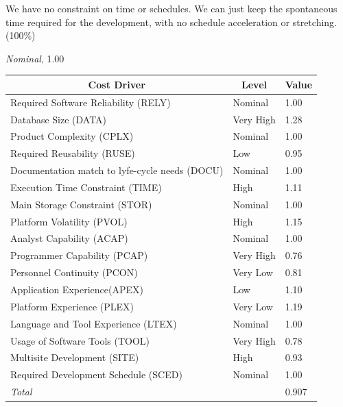 \documentclass[english]{article}
\begin{document}
\begin{itemize}
We have no constraint on time or schedules. We can just keep the spontaneous time required for the development, with no schedule acceleration or stretching. (100\%)

\textit{Nominal}, 1.00


\end{itemize}

\begin{center}
	\begin{tabular}{|p{8cm}|p{2cm}|p{1cm}|}
		\hline
		\multicolumn{1}{|c|}{\textbf{Cost Driver}} & \multicolumn{1}{c|}{\textbf{Level}} & \multicolumn{1}{c|}{\textbf{Value}} \\
		\hline
		Required Software Reliability (RELY) & Nominal & 1.00 \\
		Database Size (DATA) & Very High & 1.28 \\
		Product Complexity (CPLX) & Nominal & 1.00 \\
		Required Reusability (RUSE) & Low & 0.95 \\
		Documentation match to lyfe-cycle needs (DOCU) & Nominal & 1.00 \\
		Execution Time Constraint (TIME) & High & 1.11 \\
		Main Storage Constraint (STOR) & Nominal & 1.00 \\
		Platform Volatility (PVOL) & High & 1.15 \\
		Analyst Capability (ACAP) & Nominal & 1.00 \\
		Programmer Capability (PCAP) & Very High & 0.76 \\
		Personnel Continuity (PCON) & Very Low & 0.81 \\
		Application Experience(APEX) & Low & 1.10 \\
		Platform Experience (PLEX) & Very Low & 1.19 \\
		Language and Tool Experience (LTEX) & Nominal & 1.00 \\
		Usage of Software Tools (TOOL) & Very High & 0.78 \\
		Multisite Development (SITE) & High & 0.93 \\
		Required Development Schedule (SCED) & Nominal & 1.00 \\
		\hline
		\multicolumn{2}{|l|}{\textit{Total}} & 0.907 \\
		\hline
	\end{tabular}
\end{center}
\end{document}
